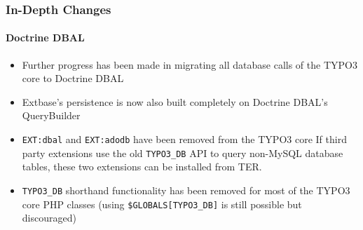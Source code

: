 
\begin{frame}[fragile]
	\frametitle{In-Depth Changes}
	\framesubtitle{Doctrine DBAL}

	\begin{itemize}
		\item Further progress has been made in migrating all database calls of the TYPO3 core to Doctrine DBAL
		\item Extbase's persistence is now also built completely on Doctrine DBAL's QueryBuilder
		\item \texttt{EXT:dbal} and \texttt{EXT:adodb} have been removed from the TYPO3 core\newline
			\smaller
				If third party extensions use the old \texttt{TYPO3\_DB} API to query non-MySQL database tables,
				these two extensions can be installed from TER.
			\normalsize

		\item \texttt{TYPO3\_DB} shorthand functionality has been removed for most of the TYPO3 core PHP classes\newline
			\smaller
				(using \texttt{\$GLOBALS[TYPO3\_DB]} is still possible but discouraged)
			\normalsize

	\end{itemize}

\end{frame}



